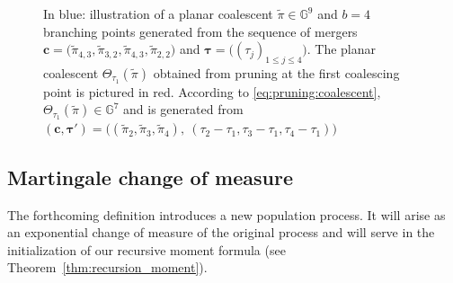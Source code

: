 \begin{refsegment}
\begin{figure}
{


   }
    \caption{In blue: illustration of a planar coalescent $\tilde\pi\in \mathbb{G}^9$ and $b=4$ branching points generated
from the sequence of mergers $\bm c=\big(\tilde\pi_{4,3},\tilde\pi_{3,2},\tilde\pi_{4,3},\tilde\pi_{2,2}\big)$ and $\bm\tau = \big((\tau_j)_{1\leqslant j\leqslant 4}\big)$. The planar coalescent $\Theta_{\tau_1}(\tilde\pi)$ obtained from pruning at the first coalescing point is pictured in red. According to \eqref{eq:pruning:coalescent}, $\Theta_{\tau_1}(\tilde\pi)\in\mathbb{G}^{7}$ and is generated from $(\bm c, \bm\tau')=
\big(( \tilde\pi_2, \tilde\pi_3, \tilde\pi_4),~(\tau_2-\tau_1, \tau_3-\tau_1, 
\tau_4-\tau_1)\big)$}\label{fig:ch3_alternative_chrono_marked}
\end{figure}


\subsection{Martingale change of measure}\label{sec:spine}

The forthcoming definition introduces a new population process. It will arise as an exponential change of measure of the original process and will serve in the initialization of our recursive moment formula (see Theorem~\ref{thm:recursion_moment}).



\end{refsegment}
